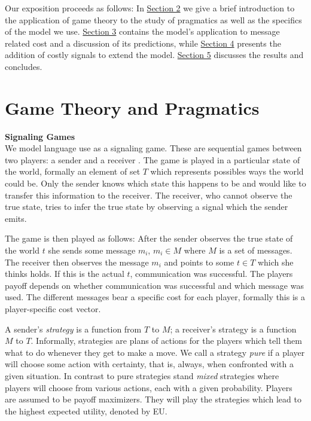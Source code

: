 \documentclass[10pt,a4paper]{article}
\begin{document}
Our exposition proceeds as follows: In \hyperref[section2]{Section 2} we give a brief introduction to the application of game theory to the study of pragmatics as well as the specifics of the model we use. \hyperref[section3]{Section 3} contains the model's application to message related cost and a discussion of its predictions, while \hyperref[section4]{Section 4} presents the addition of costly signals to extend the model. \hyperref[section5]{Section 5} discusses the results and concludes.
\section{Game Theory and Pragmatics}
\label{section2}
\textbf{Signaling Games}\\
We model language use as a signaling game. These are sequential games between two players: a sender and a receiver \cite{david1969convention}. The game is played in a particular state of the world, formally an element of set $T$ which represents possibles ways the world could be. Only the sender knows which state this happens to be and would like to transfer this information to the receiver. The receiver, who cannot observe the true state, tries to infer the true state by observing a signal which the sender emits.

The game is then played as follows: After the sender observes the true state of the world $t$ she sends some message $m_i$, $m_i \in M$ where $M$ is a set of messages. The receiver then observes the message $m_i$ and points to some $t\in T$ which she thinks holds. If this is the actual $t$, communication was successful.
The players payoff depends on whether communication was successful and which message was used. The different messages bear a specific cost for each player, formally this is a player-specific cost vector.

A sender's \textit{strategy} is a function from $T$ to $M$; a receiver's strategy is a function $M$ to $T$. Informally, strategies are plans of actions for the players which tell them what to do whenever they get to make a move. We call a strategy \textit{pure} if a player will choose some action with certainty, that is, always, when confronted with a given situation. In contrast to pure strategies stand \textit{mixed} strategies where players will choose from various actions, each with a given probability.
Players are assumed to be payoff maximizers. They will play the strategies which lead to the highest expected utility, denoted by EU.
\end{document}
